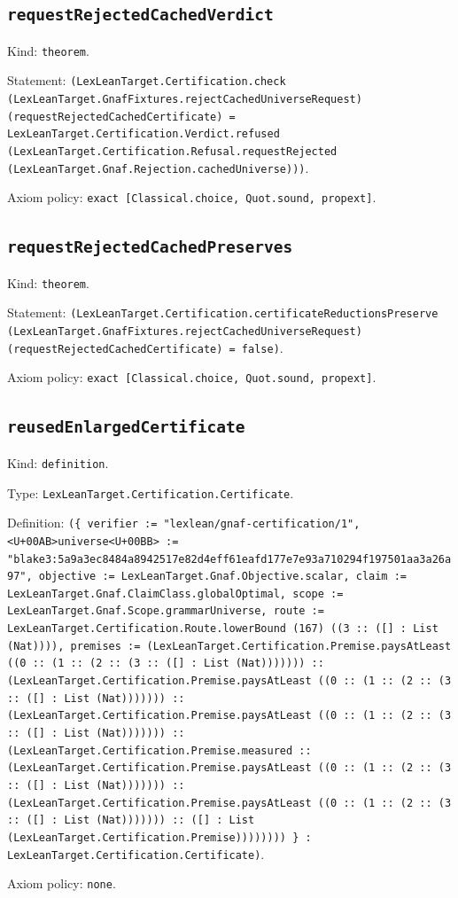 \documentclass[11pt]{article}
\begin{document}
\subsection*{\texttt{requestRejectedCachedVerdict}}
\noindent Kind: \texttt{theorem}.\par
\noindent Statement: \texttt{(LexLeanTarget.Certification.check (LexLeanTarget.GnafFixtures.rejectCachedUniverseRequest) (requestRejectedCachedCertificate) = LexLeanTarget.Certification.Verdict.refused (LexLeanTarget.Certification.Refusal.requestRejected (LexLeanTarget.Gnaf.Rejection.cachedUniverse)))}.\par
\noindent Axiom policy: \texttt{exact [Classical.choice, Quot.sound, propext]}.\par
\subsection*{\texttt{requestRejectedCachedPreserves}}
\noindent Kind: \texttt{theorem}.\par
\noindent Statement: \texttt{(LexLeanTarget.Certification.certificateReductionsPreserve (LexLeanTarget.GnafFixtures.rejectCachedUniverseRequest) (requestRejectedCachedCertificate) = false)}.\par
\noindent Axiom policy: \texttt{exact [Classical.choice, Quot.sound, propext]}.\par
\subsection*{\texttt{reusedEnlargedCertificate}}
\noindent Kind: \texttt{definition}.\par
\noindent Type: \texttt{LexLeanTarget.Certification.Certificate}.\par
\noindent Definition: \texttt{(\{ verifier := "lexlean/gnaf-certification/1", <U+00AB>universe<U+00BB> := "blake3:5a9a3ec8484a8942517e82d4eff61eafd177e7e93a710294f197501aa3a26a97", objective := LexLeanTarget.Gnaf.Objective.scalar, claim := LexLeanTarget.Gnaf.ClaimClass.globalOptimal, scope := LexLeanTarget.Gnaf.Scope.grammarUniverse, route := LexLeanTarget.Certification.Route.lowerBound (167) ((3 :: ([] : List (Nat)))), premises := (LexLeanTarget.Certification.Premise.paysAtLeast ((0 :: (1 :: (2 :: (3 :: ([] : List (Nat))))))) :: (LexLeanTarget.Certification.Premise.paysAtLeast ((0 :: (1 :: (2 :: (3 :: ([] : List (Nat))))))) :: (LexLeanTarget.Certification.Premise.paysAtLeast ((0 :: (1 :: (2 :: (3 :: ([] : List (Nat))))))) :: (LexLeanTarget.Certification.Premise.measured :: (LexLeanTarget.Certification.Premise.paysAtLeast ((0 :: (1 :: (2 :: (3 :: ([] : List (Nat))))))) :: (LexLeanTarget.Certification.Premise.paysAtLeast ((0 :: (1 :: (2 :: (3 :: ([] : List (Nat))))))) :: ([] : List (LexLeanTarget.Certification.Premise)))))))) \} : LexLeanTarget.Certification.Certificate)}.\par
\noindent Axiom policy: \texttt{none}.\par
\end{document}

